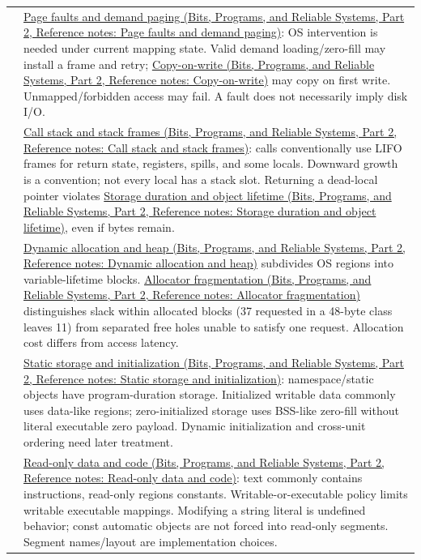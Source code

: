 {\begin{longtable}[]{@{}
  >{\raggedright\arraybackslash}p{}
  >{\raggedright\arraybackslash}p{}@{}}
56 & \href{../01-Bits-Programs-and-Reliable-Systems-P02/main.pdf\#appendix-cc0909a7ef14}{Page faults and demand paging (Bits, Programs, and Reliable Systems, Part 2, Reference notes: Page faults and demand paging)}: OS intervention is needed under current mapping state. Valid demand loading/zero-fill may install a frame and retry; \href{../01-Bits-Programs-and-Reliable-Systems-P02/main.pdf\#appendix-7a06e5baac04}{Copy-on-write (Bits, Programs, and Reliable Systems, Part 2, Reference notes: Copy-on-write)} may copy on first write. Unmapped/forbidden access may fail. A fault does not necessarily imply disk I/O. \\
57 & \href{../01-Bits-Programs-and-Reliable-Systems-P02/main.pdf\#appendix-b081b7abe193}{Call stack and stack frames (Bits, Programs, and Reliable Systems, Part 2, Reference notes: Call stack and stack frames)}: calls conventionally use LIFO frames for return state, registers, spills, and some locals. Downward growth is a convention; not every local has a stack slot. Returning a dead-local pointer violates \href{../01-Bits-Programs-and-Reliable-Systems-P02/main.pdf\#appendix-0b104bcba06b}{Storage duration and object lifetime (Bits, Programs, and Reliable Systems, Part 2, Reference notes: Storage duration and object lifetime)}, even if bytes remain. \\
58 & \href{../01-Bits-Programs-and-Reliable-Systems-P02/main.pdf\#appendix-c3480f7d9ff3}{Dynamic allocation and heap (Bits, Programs, and Reliable Systems, Part 2, Reference notes: Dynamic allocation and heap)} subdivides OS regions into variable-lifetime blocks. \href{../01-Bits-Programs-and-Reliable-Systems-P02/main.pdf\#appendix-a7c50686d81f}{Allocator fragmentation (Bits, Programs, and Reliable Systems, Part 2, Reference notes: Allocator fragmentation)} distinguishes slack within allocated blocks (37 requested in a 48-byte class leaves 11) from separated free holes unable to satisfy one request. Allocation cost differs from access latency. \\
59 & \href{../01-Bits-Programs-and-Reliable-Systems-P02/main.pdf\#appendix-17c93c4c2f19}{Static storage and initialization (Bits, Programs, and Reliable Systems, Part 2, Reference notes: Static storage and initialization)}: namespace/static objects have program-duration storage. Initialized writable data commonly uses data-like regions; zero-initialized storage uses BSS-like zero-fill without literal executable zero payload. Dynamic initialization and cross-unit ordering need later treatment. \\
60 & \href{../01-Bits-Programs-and-Reliable-Systems-P02/main.pdf\#appendix-5f9e5e2f0a5e}{Read-only data and code (Bits, Programs, and Reliable Systems, Part 2, Reference notes: Read-only data and code)}: text commonly contains instructions, read-only regions constants. Writable-or-executable policy limits writable executable mappings. Modifying a string literal is undefined behavior; const automatic objects are not forced into read-only segments. Segment names/layout are implementation choices. \\

\end{longtable}}
